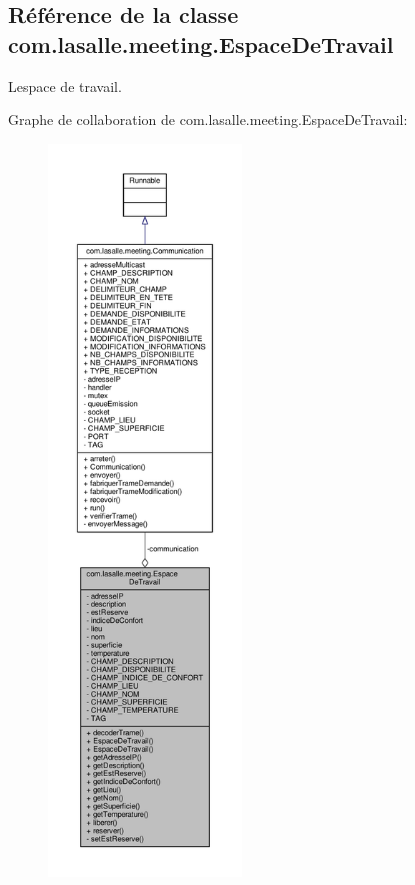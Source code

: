 \hypertarget{classcom_1_1lasalle_1_1meeting_1_1_espace_de_travail}{}\subsection{Référence de la classe com.\+lasalle.\+meeting.\+Espace\+De\+Travail}
\label{classcom_1_1lasalle_1_1meeting_1_1_espace_de_travail}


L\textquotesingle{}espace de travail.  




Graphe de collaboration de com.\+lasalle.\+meeting.\+Espace\+De\+Travail\+:\nopagebreak
\begin{figure}[H]
\begin{center}
\leavevmode
\includegraphics[height=550pt]{classcom_1_1lasalle_1_1meeting_1_1_espace_de_travail__coll__graph}
\end{center}
\end{figure}
